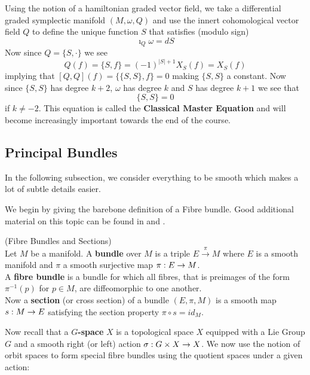 Using the notion of a hamiltonian graded vector field, we take a differential graded symplectic manifold $(M,\omega, Q)$ and use the innert cohomological vector field $Q$ to define the unique function $S$ that satisfies (modulo sign)
$$ \imath_Q \omega = dS $$
Now since $Q = \{S,\cdot\}$ we see
$$ Q(f) = \{S, f\} = (-1)^{|S|+1} X_S(f) = X_S(f) $$
implying that $[Q,Q](f) = \{\{S,S\},f\} = 0$ making $\{S,S\}$ a constant. Now since $\{S,S\}$ has degree $k+2$, $\omega$ has degree $k$ and $S$ has degree $k+1$ we see that
\begin{equation}\label{ClassicalMasterEquation}\tag{CME}
  \{S,S\} = 0
\end{equation}
if $k \neq -2$. This equation is called the \textbf{Classical Master Equation} and will become increasingly important towards the end of the course.

\newpage
\subsection{Principal Bundles}

\begin{rem}
  In the following subsection, we consider everything to be smooth which makes a lot of subtle details easier.
\end{rem}

We begin by giving the barebone definition of a Fibre bundle. Good additional material on this topic can be found in   and .

\begin{definition} (Fibre Bundles and Sections)\\
  Let $M$ be a manifold. A \textbf{bundle} over $M$ is a triple $E\overset{\pi}{\longrightarrow}M$ where $E$ is a smooth manifold and $\pi$ a smooth surjective map $\pi:E\rightarrow M$.\\
  A \textbf{fibre bundle} is a bundle for which all fibres, that is preimages of the form $\pi^{-1}(p)$ for $p\in M$, are diffeomorphic to one another.\\
  Now a \textbf{section} (or cross section) of a bundle $(E,\pi,M)$ is a smooth map $s:M\rightarrow E$ satisfying the section property $\pi \circ s = id_M$.
\end{definition}

Now recall that a \textbf{$G$-space} $X$ is a topological space $X$ equipped with a Lie Group $G$ and a smooth right (or left) action $\sigma:G\times X \rightarrow X$. We now use the notion of orbit spaces to form special fibre bundles using the quotient spaces under a given action:

